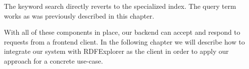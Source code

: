 The keyword search directly reverts to the specialized index. The query term works as was previously described in this chapter.

With all of these components in place, our backend can accept and respond to requests from a frontend client. In the following chapter we will describe how to integrate our system with RDFExplorer as the client in order to apply our approach for a concrete use-case.

